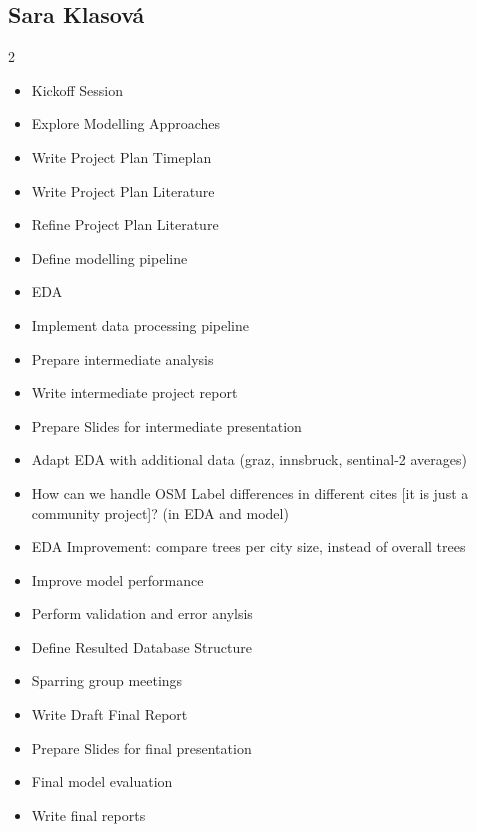 \vspace{-1em}

\subsection*{Sara Klasová}

{\footnotesize
\begin{multicols}{2}
\begin{itemize}[leftmargin=*, nosep]
    \item Kickoff Session
    \item Explore Modelling Approaches
    \item Write Project Plan Timeplan
    \item Write Project Plan Literature
    \item Refine Project Plan Literature
    \item Define modelling pipeline
    \item EDA
    \item Implement data processing pipeline
    \item Prepare intermediate analysis
    \item Write intermediate project report
    \item Prepare Slides for intermediate presentation
    \item Adapt EDA with additional data (graz, innsbruck, sentinal-2 averages)
    \item How can we handle OSM Label differences in different cites [it is just a community project]? (in EDA and model)
    \item EDA Improvement: compare trees per city size, instead of overall trees
    \item Improve model performance
    \item Perform validation and error anylsis
    \item Define Resulted Database Structure
    \item Sparring group meetings
    \item Write Draft Final Report
    \item Prepare Slides for final presentation
    \item Final model evaluation
    \item Write final reports
\end{itemize}
\end{multicols}
}